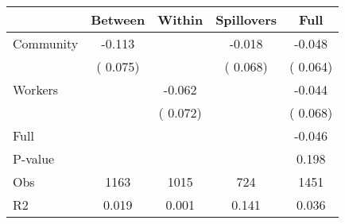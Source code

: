
\begin{tabular}{l*{4}{c}}\hline&\multicolumn{1}{c}{Between}&\multicolumn{1}{c}{Within}&\multicolumn{1}{c}{Spillovers}&\multicolumn{1}{c}{Full}\\ \hline
 Community             &             -0.113      &                                               &       -0.018 &        -0.048                            \\ 
                               &        (       0.075)           &                                       &       (       0.068)     &      (       0.064)                                           \\ 
 Workers       &                                               &       -0.062    &                                &            -0.044                            \\ 
                               &                                               & (       0.072)                  &                                        &      (       0.068)                                           \\ 
\hline                                                                                                                                                                                                                                            
 Full                  &                                               &                                               &                                        &            -0.046                                     \\ 
 P-value               &                                               &                                               &                                        &             0.198                                           \\ 
 Obs                   &               1163               &       1015                       &       724                &              1451                                               \\ 
 R2                    &                      0.019              &              0.001                      &              0.141               &                     0.036                                              \\ 
\hline \end{tabular}                                                                                                                                                                                                              